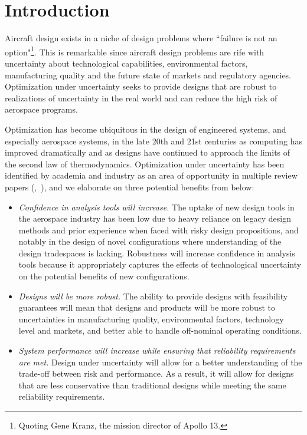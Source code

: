 \section{Introduction}

Aircraft design exists in a niche of design problems where ``failure is
not an option"\footnote{Quoting Gene Kranz, the mission director of Apollo 13.}.
This is remarkable since aircraft design problems are rife with uncertainty about
technological capabilities, environmental factors, manufacturing quality and the future
state of markets and regulatory agencies.
Optimization under uncertainty seeks to provide designs that are robust
to realizations of uncertainty in the real world and can reduce
the high risk of aerospace programs.

Optimization has become ubiquitous in the design of engineered systems, and especially aerospace systems,
in the late 20th and 21st centuries as computing has improved dramatically and as designs have
continued to approach the limits of the second law of thermodynamics. Optimization under uncertainty
has been identified by academia and industry as an area of opportunity
in multiple review papers (\cite{Zang2002},~\cite{Yao2011}),
and we elaborate on three potential benefits from \cite{Zang2002} below:
\begin{itemize}
    \item \emph{Confidence in analysis tools will increase.}
    The uptake of new design tools in the aerospace industry has been low
    due to heavy reliance on legacy design methods and prior experience when
    faced with risky design propositions, and notably in
    the design of novel configurations where understanding
    of the design tradespaces is lacking. Robustness will increase
    confidence in analysis tools because it appropriately captures the
    effects of technological uncertainty on the potential benefits of new
    configurations.
    \item \emph{Designs will be more robust.}
    The ability to provide designs with feasibility guarantees will mean
    that designs and products will be more robust to uncertainties in manufacturing quality,
    environmental factors, technology level and markets, and better able to
    handle off-nominal operating conditions.
    \item \emph{System performance will increase while ensuring that reliability requirements
    are met.}
    Design under uncertainty will allow for a better understanding of the trade-off between risk and
    performance. As a result, it will allow for designs that are less conservative than
    traditional designs while meeting the same reliability requirements.
\end{itemize}

